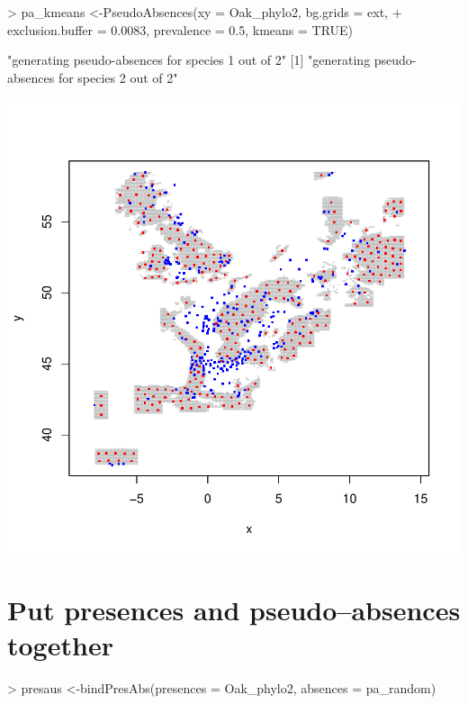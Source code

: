 \documentclass[10pt,a4paper]{report}
\begin{document}
\begin{Schunk}
\begin{Sinput}
> pa_kmeans <-PseudoAbsences(xy = Oak_phylo2, bg.grids = ext, 
+ 	exclusion.buffer = 0.0083, prevalence = 0.5, kmeans = TRUE)
\end{Sinput}
\begin{Soutput}
[1] "generating pseudo-absences for species 1 out of 2"
[1] "generating pseudo-absences for species 2 out of 2"
\end{Soutput}
\end{Schunk}
\includegraphics{mopa-mopa10}

\section{Put presences and pseudo--absences together}

\begin{Schunk}
\begin{Sinput}
> presaus <-bindPresAbs(presences = Oak_phylo2, absences = pa_random)
\end{Sinput}
\end{Schunk}
\end{document}
